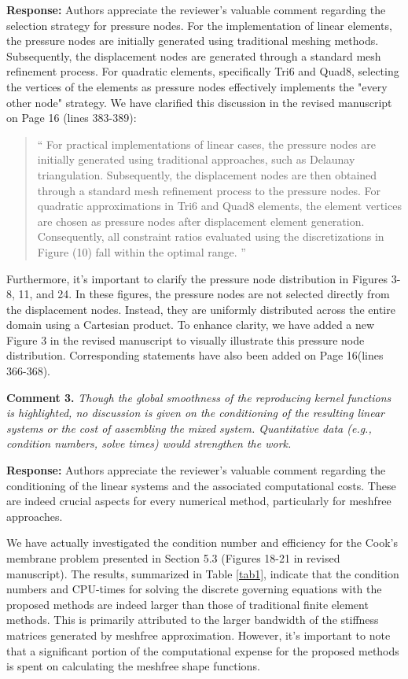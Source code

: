\documentclass{article}
\begin{document}
\textbf{Response:} 
Authors appreciate the reviewer's valuable comment regarding the selection strategy for pressure nodes.
For the implementation of linear elements, the pressure nodes are initially generated using traditional meshing methods.
Subsequently, the displacement nodes are generated through a standard mesh refinement process.
For quadratic elements, specifically Tri6 and Quad8, selecting the vertices of the elements as pressure nodes effectively implements the "every other node" strategy.
We have clarified this discussion in the revised manuscript on Page 16 (lines 383-389):

\begin{quote}``
For practical implementations of linear cases, the pressure nodes are initially generated using traditional approaches, such as Delaunay triangulation.
Subsequently, the displacement nodes are then obtained through a standard mesh refinement process to the pressure nodes.
For quadratic approximations in Tri6 and Quad8 elements, the element vertices are chosen as pressure nodes after displacement element generation.
Consequently, all constraint ratios evaluated using the discretizations in Figure (10) fall within the optimal range.
''\end{quote}

Furthermore, it's important to clarify the pressure node distribution in Figures 3-8, 11, and 24.
In these figures, the pressure nodes are not selected directly from the displacement nodes.
Instead, they are uniformly distributed across the entire domain using a Cartesian product.
To enhance clarity, we have added a new Figure 3 in the revised manuscript to visually illustrate this pressure node distribution.
Corresponding statements have also been added on Page 16(lines 366-368).

\textbf{Comment 3.} \textit{
Though the global smoothness of the reproducing kernel functions is highlighted, no discussion is given on the conditioning of the resulting linear systems or the cost of assembling the mixed system. Quantitative data (e.g., condition numbers, solve times) would strengthen the work.
}

\textbf{Response:} Authors appreciate the reviewer's valuable comment regarding the conditioning of the linear systems and the associated computational costs. These are indeed crucial aspects for every numerical method, particularly for meshfree approaches.

We have actually investigated the condition number and efficiency for the Cook's membrane problem presented in Section 5.3 (Figures 18-21 in revised manuscript). The results, summarized in Table \ref{tab1}, indicate that the condition numbers and CPU-times for solving the discrete governing equations with the proposed methods are indeed larger than those of traditional finite element methods. This is primarily attributed to the larger bandwidth of the stiffness matrices generated by meshfree approximation. However, it's important to note that a significant portion of the computational expense for the proposed methods is spent on calculating the meshfree shape functions.
\end{document}
